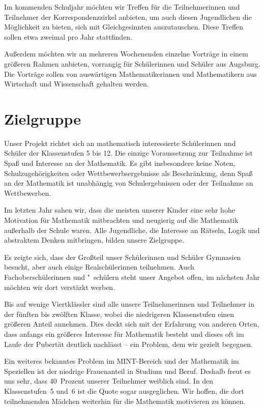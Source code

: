\documentclass[12pt]{zettel}
\begin{document}
Im kommenden Schuljahr möchten wir Treffen für die Teilnehmerinnen und
Teilnehmer der Korrespondenzzirkel anbieten, um auch diesen Jugendlichen die
Möglichkeit zu bieten, sich mit Gleichgesinnten auszutauschen. Diese Treffen
sollen etwa zweimal pro Jahr stattfinden.

Außerdem möchten wir an mehreren Wochenenden einzelne Vorträge in einem
größeren Rahmen anbieten, vorrangig für Schülerinnen und Schüler aus Augsburg.
Die Vorträge sollen von auswärtigen Mathematikerinnen und Mathematikern aus
Wirtschaft und Wissenschaft gehalten werden.


\section{Zielgruppe}

Unser Projekt richtet sich an mathematisch interessierte Schülerinnen
und Schüler der Klassenstufen 5 bis 12. Die einzige Voraussetzung zur
Teilnahme ist Spaß und Interesse an der Mathematik. Es gibt insbesondere
keine Noten, Schulzugehörigkeiten oder Wettbewerbsergebnisse als
Beschränkung, denn Spaß an der Mathematik
ist unabhängig von Schulergebnissen oder der Teilnahme an
Wettbewerben.

Im letzten Jahr sahen wir, dass die meisten unserer Kinder eine
sehr hohe Motivation für Mathematik mitbrachten und neugierig auf die
Mathematik außerhalb der Schule waren. Alle Jugendliche, die Interesse an
Rätseln, Logik und abstraktem Denken mitbringen, bilden unsere
Zielgruppe.

Es zeigte sich, dass der Großteil unser Schülerinnen und
Schüler Gymnasien besucht, aber auch einige Realschülerinnen teilnehmen.
Auch Fachoberschülerinnen und "~schülern steht unser Angebot offen, im nächsten
Jahr möchten wir dort verstärkt werben.

Bis auf wenige Viertklässler sind alle unsere Teilnehmerinnen und
Teilnehmer in der fünften bis zwölften Klasse, wobei die niedrigeren
Klassenstufen einen größeren Anteil annehmen. Dies deckt sich mit der
Erfahrung von anderen Orten, dass anfangs ein größeres Interesse für
Mathematik besteht und dieses oft im Laufe der Pubertät
deutlich nachlässt -- ein Problem, dem wir gezielt begegnen.

Ein weiteres bekanntes Problem im MINT-Bereich
und der Mathematik im Speziellen ist der niedrige Frauenanteil in
Studium und Beruf. Deshalb freut es uns sehr, dass 40~Prozent unserer
Teilnehmer weiblich sind. In den Klassenstufen~5 und~6 ist die Quote sogar
ausgeglichen. Wir hoffen, die dort teilnehmenden Mädchen weiterhin für die
Mathematik motivieren zu können.
\end{document}
